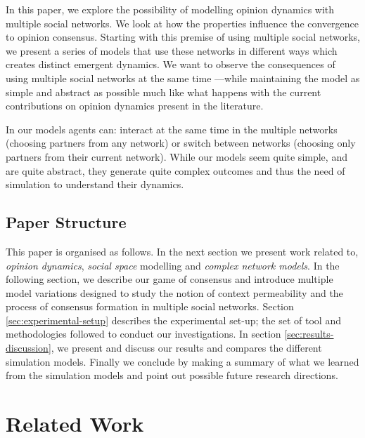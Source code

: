 \documentclass[preprint,number]{elsarticle}
\begin{document}
	In this paper, we explore the possibility of modelling opinion dynamics with multiple social networks. We look at how the properties influence the convergence to opinion consensus. Starting with this premise of 
	using multiple social networks, we present a series of models that use these networks in different ways which creates distinct emergent dynamics. We want to observe the consequences of using multiple social networks at the same time ---while maintaining the model as simple and abstract as possible much like what happens with the current contributions on opinion dynamics present in the literature. 
	
	In our models agents can: interact at the same time in the multiple networks (choosing partners from any network) or switch between networks (choosing only partners from their current network). While our models seem quite simple, and are quite abstract, they generate quite complex outcomes and thus the need of simulation to understand their dynamics.
	
	\subsection{Paper Structure}
	This paper is organised as follows. In the next section we present work related to, \textit{opinion dynamics}, \textit{social space} modelling and \textit{complex network models}. In the following section, we describe our game of consensus and introduce multiple model variations designed to study the notion of context permeability and the process of consensus formation in multiple social networks. Section \ref{sec:experimental-setup} describes the experimental set-up; the set of tool and methodologies followed to conduct our investigations. In section \ref{sec:results-discussion}, we present and discuss our results and compares the different simulation models. Finally we conclude by making a summary of what we learned from the simulation models and point out possible future research directions.
	
	\section{Related Work}
	\label{sec:relatedwork}
\end{document}
